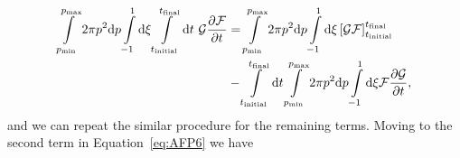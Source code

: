 \documentclass[preprint,aip]{revtex4-2}
\begin{document}
\begin{equation}\label{eq:AFP7}
\begin{aligned}
	\int\displaylimits_{p_\mathrm{min}}^{p_\mathrm{max}}2\pi p^2 \mathrm{d}p
	\int\displaylimits_{-1}^{1}\mathrm{d}\xi
	\int\displaylimits_{t_\mathrm{initial}}^{t_\mathrm{final}}\mathrm{d}t \ 
	 \mathcal{G}\frac{\partial\mathcal{F}}{\partial t} &= 
	 \int\displaylimits_{p_\mathrm{min}}^{p_\mathrm{max}}2\pi p^2 \mathrm{d}p
	\int\displaylimits_{-1}^{1}\mathrm{d}\xi \left[\mathcal{GF}\right]_{t_\mathrm{initial}}^{t_\mathrm{final}} \\
	&-
	\int\displaylimits_{t_\mathrm{initial}}^{t_\mathrm{final}}\mathrm{d}t 
	\int\displaylimits_{p_\mathrm{min}}^{p_\mathrm{max}}2\pi p^2 \mathrm{d}p
	\int\displaylimits_{-1}^{1}\mathrm{d}\xi \mathcal{F}\frac{\partial\mathcal{G}}{\partial t},
\end{aligned}
\end{equation}
and we can repeat the similar procedure for the remaining terms. Moving to the second term in Equation~\ref{eq:AFP6} we have
\end{document}
